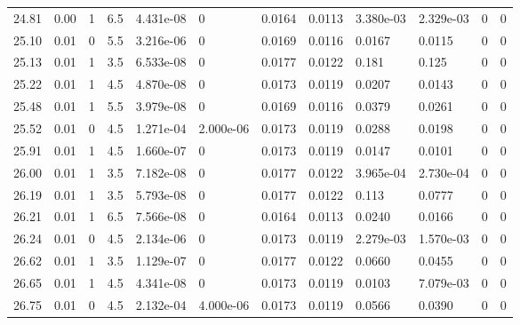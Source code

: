 \documentclass[preview]{standalone}
\begin{document}
{{{\begin{tabular}{L{1.2cm}C{1.2cm} C{0.3cm}C{0.5cm} C{1.4cm}C{1.4cm} C{1.4cm}C{1.4cm} C{1.6cm}C{1.6cm} C{1.6cm}C{1.6cm}}
  24.81  &  0.00  & 1     & 6.5 &  4.431e-08  & 0  &  0.0164&   0.0113& 3.380e-03 & 2.329e-03   &  0 & 0  \\ 
  25.10  &  0.01  & 0     & 5.5 &  3.216e-06  & 0  &  0.0169&   0.0116& 0.0167 & 0.0115   &  0 & 0  \\ 
  25.13  &  0.01  & 1     & 3.5 &  6.533e-08  & 0  &  0.0177&   0.0122& 0.181 & 0.125   &  0 & 0  \\ 
  25.22  &  0.01  & 1     & 4.5 &  4.870e-08  & 0  &  0.0173&   0.0119& 0.0207 & 0.0143   &  0 & 0  \\ 
  25.48  &  0.01  & 1     & 5.5 &  3.979e-08  & 0  &  0.0169&   0.0116& 0.0379 & 0.0261   &  0 & 0  \\ 
  25.52  &  0.01  & 0     & 4.5 &  1.271e-04  & 2.000e-06  &  0.0173&   0.0119& 0.0288 & 0.0198   &  0 & 0  \\ 
  25.91  &  0.01  & 1     & 4.5 &  1.660e-07  & 0  &  0.0173&   0.0119& 0.0147 & 0.0101   &  0 & 0  \\ 
  26.00  &  0.01  & 1     & 3.5 &  7.182e-08  & 0  &  0.0177&   0.0122& 3.965e-04 & 2.730e-04   &  0 & 0  \\ 
  26.19  &  0.01  & 1     & 3.5 &  5.793e-08  & 0  &  0.0177&   0.0122& 0.113 & 0.0777   &  0 & 0  \\ 
  26.21  &  0.01  & 1     & 6.5 &  7.566e-08  & 0  &  0.0164&   0.0113& 0.0240 & 0.0166   &  0 & 0  \\ 
  26.24  &  0.01  & 0     & 4.5 &  2.134e-06  & 0  &  0.0173&   0.0119& 2.279e-03 & 1.570e-03   &  0 & 0  \\ 
  26.62  &  0.01  & 1     & 3.5 &  1.129e-07  & 0  &  0.0177&   0.0122& 0.0660 & 0.0455   &  0 & 0  \\ 
  26.65  &  0.01  & 1     & 4.5 &  4.341e-08  & 0  &  0.0173&   0.0119& 0.0103 & 7.079e-03   &  0 & 0  \\ 
  26.75  &  0.01  & 0     & 4.5 &  2.132e-04  & 4.000e-06  &  0.0173&   0.0119& 0.0566 & 0.0390   &  0 & 0  \\ 
\hline 
\end{tabular} 

}}}
\end{document}
